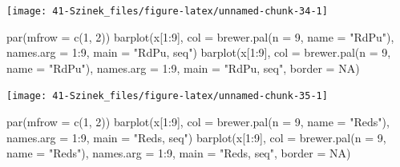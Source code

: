 \documentclass[
]{book}
\newenvironment{Shaded}{\begin{snugshade}}{\end{snugshade}}
\newcommand{\AttributeTok}[1]{\textcolor[rgb]{0.77,0.63,0.00}{#1}}
\newcommand{\ConstantTok}[1]{\textcolor[rgb]{0.00,0.00,0.00}{#1}}
\newcommand{\DecValTok}[1]{\textcolor[rgb]{0.00,0.00,0.81}{#1}}
\newcommand{\FunctionTok}[1]{\textcolor[rgb]{0.00,0.00,0.00}{#1}}
\newcommand{\NormalTok}[1]{#1}
\newcommand{\SpecialCharTok}[1]{\textcolor[rgb]{0.00,0.00,0.00}{#1}}
\newcommand{\StringTok}[1]{\textcolor[rgb]{0.31,0.60,0.02}{#1}}
\begin{document}
\begin{center}\texttt{[image: 41-Szinek\_files/figure-latex/unnamed-chunk-34-1]} \end{center}

\begin{Shaded}
\begin{Highlighting}[]
\FunctionTok{par}\NormalTok{(}\AttributeTok{mfrow =} \FunctionTok{c}\NormalTok{(}\DecValTok{1}\NormalTok{, }\DecValTok{2}\NormalTok{))}
\FunctionTok{barplot}\NormalTok{(x[}\DecValTok{1}\SpecialCharTok{:}\DecValTok{9}\NormalTok{], }\AttributeTok{col =} \FunctionTok{brewer.pal}\NormalTok{(}\AttributeTok{n =} \DecValTok{9}\NormalTok{, }\AttributeTok{name =} \StringTok{"RdPu"}\NormalTok{), }\AttributeTok{names.arg =} \DecValTok{1}\SpecialCharTok{:}\DecValTok{9}\NormalTok{, }\AttributeTok{main =} \StringTok{"RdPu, seq"}\NormalTok{)}
\FunctionTok{barplot}\NormalTok{(x[}\DecValTok{1}\SpecialCharTok{:}\DecValTok{9}\NormalTok{], }\AttributeTok{col =} \FunctionTok{brewer.pal}\NormalTok{(}\AttributeTok{n =} \DecValTok{9}\NormalTok{, }\AttributeTok{name =} \StringTok{"RdPu"}\NormalTok{), }\AttributeTok{names.arg =} \DecValTok{1}\SpecialCharTok{:}\DecValTok{9}\NormalTok{, }\AttributeTok{main =} \StringTok{"RdPu, seq"}\NormalTok{, }
    \AttributeTok{border =} \ConstantTok{NA}\NormalTok{)}
\end{Highlighting}
\end{Shaded}

\begin{center}\texttt{[image: 41-Szinek\_files/figure-latex/unnamed-chunk-35-1]} \end{center}

\begin{Shaded}
\begin{Highlighting}[]
\FunctionTok{par}\NormalTok{(}\AttributeTok{mfrow =} \FunctionTok{c}\NormalTok{(}\DecValTok{1}\NormalTok{, }\DecValTok{2}\NormalTok{))}
\FunctionTok{barplot}\NormalTok{(x[}\DecValTok{1}\SpecialCharTok{:}\DecValTok{9}\NormalTok{], }\AttributeTok{col =} \FunctionTok{brewer.pal}\NormalTok{(}\AttributeTok{n =} \DecValTok{9}\NormalTok{, }\AttributeTok{name =} \StringTok{"Reds"}\NormalTok{), }\AttributeTok{names.arg =} \DecValTok{1}\SpecialCharTok{:}\DecValTok{9}\NormalTok{, }\AttributeTok{main =} \StringTok{"Reds, seq"}\NormalTok{)}
\FunctionTok{barplot}\NormalTok{(x[}\DecValTok{1}\SpecialCharTok{:}\DecValTok{9}\NormalTok{], }\AttributeTok{col =} \FunctionTok{brewer.pal}\NormalTok{(}\AttributeTok{n =} \DecValTok{9}\NormalTok{, }\AttributeTok{name =} \StringTok{"Reds"}\NormalTok{), }\AttributeTok{names.arg =} \DecValTok{1}\SpecialCharTok{:}\DecValTok{9}\NormalTok{, }\AttributeTok{main =} \StringTok{"Reds, seq"}\NormalTok{, }
    \AttributeTok{border =} \ConstantTok{NA}\NormalTok{)}
\end{Highlighting}
\end{Shaded}
\end{document}
